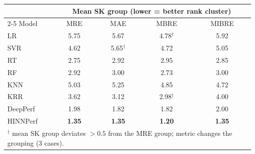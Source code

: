\begin{tabular}{lcccc}
\toprule
 & \multicolumn{4}{c}{Mean SK group (lower = better rank cluster)} \\
\cmidrule{2-5}
Model & MRE & MAE & MBRE & MIBRE \\
\midrule
LR & 5.75 & 5.67 & 4.78$^\dagger$ & 5.92 \\
SVR & 4.62 & 5.65$^\dagger$ & 4.72 & 5.05 \\
RT & 2.75 & 2.92 & 2.95 & 2.85 \\
RF & 2.92 & 3.00 & 2.73 & 3.00 \\
KNN & 5.03 & 5.25 & 4.85 & 4.72 \\
KRR & 3.62 & 3.12 & 2.98$^\dagger$ & 4.00 \\
DeepPerf & 1.98 & 1.82 & 1.82 & 2.00 \\
HINNPerf & \textbf{1.35} & \textbf{1.35} & \textbf{1.20} & \textbf{1.35} \\
\bottomrule
\multicolumn{5}{l}{\footnotesize $^\dagger$ mean SK group deviates $>0.5$ from the MRE group; metric changes the grouping (3 cases).}
\end{tabular}
